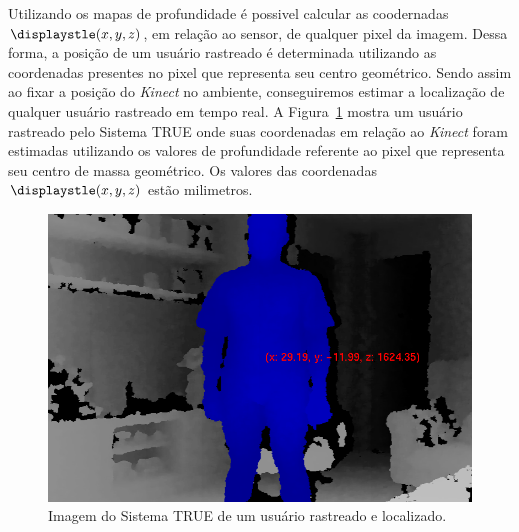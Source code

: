 	Utilizando os mapas de profundidade é possivel calcular as coodernadas $\displaystle (x,y,z)$, em relação ao sensor, de qualquer pixel da imagem. Dessa forma, a posição de um usuário rastreado é determinada utilizando as coordenadas presentes no pixel que representa seu centro geométrico. Sendo assim ao fixar a posição do \textit{Kinect} no ambiente, conseguiremos estimar a localização de qualquer usuário rastreado em tempo real. A Figura~\ref{fig:localizacao} mostra um usuário rastreado pelo Sistema TRUE onde suas coordenadas em relação ao \textit{Kinect} foram estimadas utilizando os valores de profundidade referente ao pixel que representa seu centro de massa geométrico. Os valores das coordenadas $\displaystle (x,y,z)$ estão milimetros.

	\begin{figure}[H]
		\begin{center}
			\includegraphics[scale=0.45]{figuras/4.ProblemaEProposta/localizacao.png}
		\end{center}
		\caption{Imagem do Sistema TRUE de um usuário rastreado e localizado.}
		\label{fig:localizacao}
	\end{figure}
	
